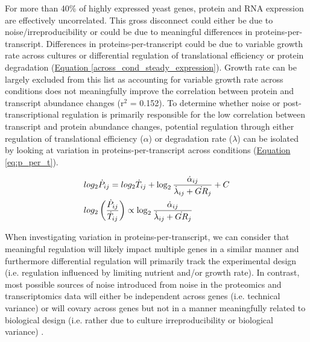 For more than 40\% of highly expressed yeast genes, protein and RNA expression are effectively uncorrelated.  This gross disconnect could either be due to noise/irreproducibility or could be due to meaningful differences in proteins-per-transcript. Differences in proteins-per-transcript could be due to variable growth rate across cultures or differential regulation of translational efficiency or protein degradation (\hyperref[across_cond_steady_expression]{Equation \ref{across_cond_steady_expression}}).  Growth rate can be largely excluded from this list as accounting for variable growth rate across conditions does not meaningfully improve the correlation between protein and transcript abundance changes (r$^{2}$ = 0.152).  To determine whether noise or post-transcriptional regulation is primarily responsible for the low correlation between transcript and protein abundance changes, potential regulation through either regulation of translational efficiency ($\alpha$) or degradation rate ($\lambda$) can be isolated by looking at variation in proteins-per-transcript across conditions (\hyperref[eq:p_per_t]{Equation \ref{eq:p_per_t}}).

\begin{align}
&log_{2}\dot{P}_{ij} = log_{2}\dot{T}_{ij} + \log_{2}\frac{\dot{\alpha}_{ij}}{\dot{\lambda}_{ij} + \dot{GR}_{j}} + C\notag\\
&log_{2}\left(\frac{\dot{P}_{ij}}{\dot{T}_{ij}}\right) \propto \log_{2}\frac{\dot{\alpha}_{ij}}{\dot{\lambda}_{ij} + \dot{GR}_{j}}\notag\\
\label{eq:p_per_t}
\end{align}

When investigating variation in proteins-per-transcript, we can consider that meaningful regulation will likely impact multiple genes in a similar manner and furthermore differential regulation will primarily track the experimental design (i.e. regulation influenced by limiting nutrient and/or growth rate).  In contrast, most possible sources of noise introduced from noise in the proteomics and transcriptomics data will either be independent across genes (i.e. technical variance) or will covary across genes but not in a manner meaningfully related to biological design (i.e. rather due to culture irreproducibility or biological variance) \cite{Leek:2007kn}.

